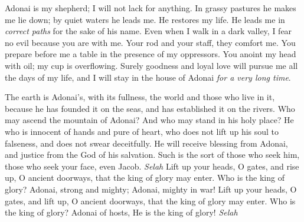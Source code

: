 \begin{biblechapter} %
 Adonai is my shepherd; 
I will not lack for anything.
\verse In grassy pastures he makes me lie down; 
by quiet waters he leads me.
\verse He restores my life. 
He leads me in \textit{correct paths} 
for the sake of his name.
\verse Even when I walk in a dark valley, I fear no evil 
because you are with me. 
Your rod and your staff, they comfort me.
\verse You prepare before me a table 
in the presence of my oppressors. 
You anoint my head with oil; 
my cup is overflowing.
\verse Surely goodness and loyal love will pursue me 
all the days of my life, 
and I will stay in the house of Adonai 
\textit{for a very long time}.
\end{biblechapter}

\begin{biblechapter} %
 The earth is Adonai’s, with its fullness, 
the world and those who live in it,
\verse because he has founded it on the seas, 
and has established it on the rivers.
\verse Who may ascend the mountain of Adonai? 
And who may stand in his holy place?
\verse He who is innocent of hands and pure of heart, 
who does not lift up his soul to falseness, 
and does not swear deceitfully.
\verse He will receive blessing from Adonai, 
and justice from the God of his salvation.
\verse Such is the sort of those who seek him, 
those who seek your face, even Jacob. \textit{Selah}
\verse Lift up your heads, O gates, 
and rise up, O ancient doorways, 
that the king of glory may enter.
\verse Who is the king of glory? 
Adonai, strong and mighty; 
Adonai, mighty in war!
\verse Lift up your heads, O gates, 
and lift up, O ancient doorways, 
that the king of glory may enter.
\verse Who is the king of glory? 
Adonai of hosts, 
He is the king of glory! \textit{Selah}
\end{biblechapter}

